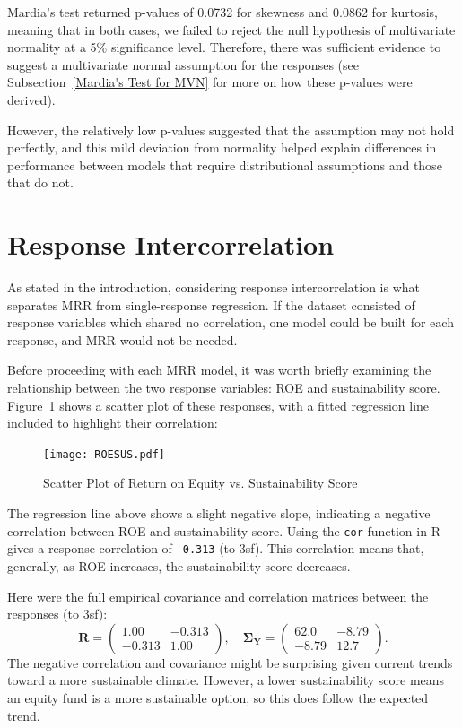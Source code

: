 \documentclass[11pt]{report} %
\begin{document}
Mardia's test returned p-values of 0.0732 for skewness and 0.0862 for kurtosis, meaning that in both cases, we failed to reject the null hypothesis of multivariate normality at a 5\% significance level. Therefore, there was sufficient evidence to suggest a multivariate normal assumption for the responses (see Subsection~\ref{Mardia's Test for MVN} for more on how these p-values were derived).

However, the relatively low p-values suggested that the assumption may not hold perfectly, and this mild deviation from normality helped explain differences in performance between models that require distributional assumptions and those that do not.
\vspace{-0.2cm}
\section{Response Intercorrelation}
As stated in the introduction, considering response intercorrelation is what separates MRR from single-response regression. If the dataset consisted of response variables which shared no correlation, one model could be built for each response, and MRR would not be needed.

Before proceeding with each MRR model, it was worth briefly examining the relationship between the two response variables: ROE and sustainability score. Figure~\ref{fig:ROESUS} shows a scatter plot of these responses, with a fitted regression line included to highlight their correlation:
\begin{figure}[H]
    \centering
    \texttt{[image: ROESUS.pdf]}
    \caption{Scatter Plot of Return on Equity vs. Sustainability Score}
    \label{fig:ROESUS}
\end{figure}
\noindent The regression line above shows a slight negative slope, indicating a negative correlation between ROE and sustainability score. Using the \texttt{cor} function in R gives a response correlation of \texttt{-0.313} (to 3sf). This correlation means that, generally, as ROE increases, the sustainability score decreases.

Here were the full empirical covariance and correlation matrices between the responses (to 3sf):
\[
\mathbf{R} =
\begin{pmatrix}
1.00 & -0.313 \\
-0.313 & 1.00
\end{pmatrix},
\quad
\mathbf{\Sigma_Y} =
\begin{pmatrix}
62.0 & -8.79 \\
-8.79 & 12.7
\end{pmatrix}.
\]
The negative correlation and covariance might be surprising given current trends toward a more sustainable climate. However, a lower sustainability score means an equity fund is a more sustainable option, so this does follow the expected trend.
\end{document}
